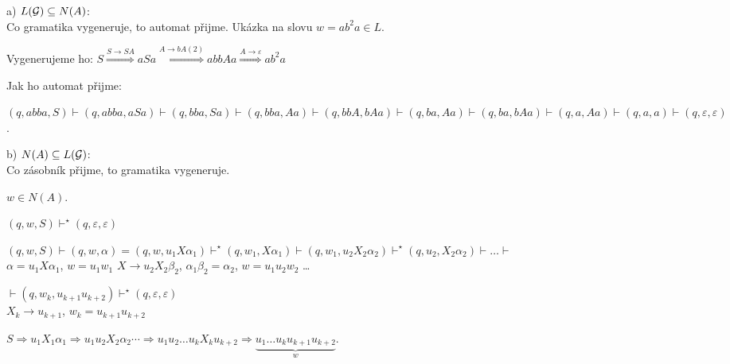 a) $L(\mathcal{G}) \subseteq N(A)$:\\ 
Co gramatika vygeneruje, to automat přijme. Ukázka na slovu $w = ab^2 a \in L$. 

Vygenerujeme ho: 
$
S \stackrel{S \rightarrow SA}{\Longrightarrow} aSa \stackrel{A \rightarrow bA (2)}{\Longrightarrow} abbAa 
\stackrel{A \rightarrow \varepsilon}{\Longrightarrow} ab^2a
$

Jak ho automat přijme:

$
(q, abba, S) \vdash (q, abba, aSa) \vdash (q, bba, Sa) \vdash (q, bba, Aa) \vdash (q, bbA, bAa) \vdash (q, ba, Aa) 
\vdash (q, ba, bAa) \vdash (q, a, Aa) \vdash (q, a, a) \vdash (q, \varepsilon, \varepsilon)
$.

b) $N(A) \subseteq L(\mathcal{G})$:\\
Co zásobník přijme, to gramatika vygeneruje. 

$w \in N(A)$. 

$(q, w, S) \vdash^{\star} (q, \varepsilon, \varepsilon) $

$(q, w, S) \vdash (q, w, \alpha) = (q, w, u_1 X \alpha_1) \vdash^{\star} (q, w_1, X \alpha_1) \vdash 
(q, w_1, u_2 X_2 \alpha_2) \vdash^{\star} (q, u_2, X_2 \alpha_2) \vdash \dots \vdash $\\ 
\hspace*{23mm}$\alpha = u_1 X \alpha_1$, $w = u_1 w_1$ \hspace*{7mm}$X \to u_2 X_2 \beta_2$, $\alpha_1 
\beta_2 = \alpha_2$, $w = u_1 u_2 w_2$ \hspace*{8mm}\dots 

\hspace*{3mm}$\vdash (q, w_k, u_{k+1} u_{k+2}) \vdash^{\star} (q, \varepsilon, \varepsilon)$ \\ 
\hspace*{8mm}$X_k \to u_{k+1}$, $w_k = u_{k+1} u_{k+2}$ 


$S \Longrightarrow u_1 X_1 \alpha_1 \Longrightarrow u_1 u_2 X_2 \alpha_2 \cdots \Longrightarrow u_1 u_2 \dots 
u_k X_k u_{k+2} \Longrightarrow \underbrace{u_1 \dots u_k u_{k+1} u_{k+2}}_w$.

